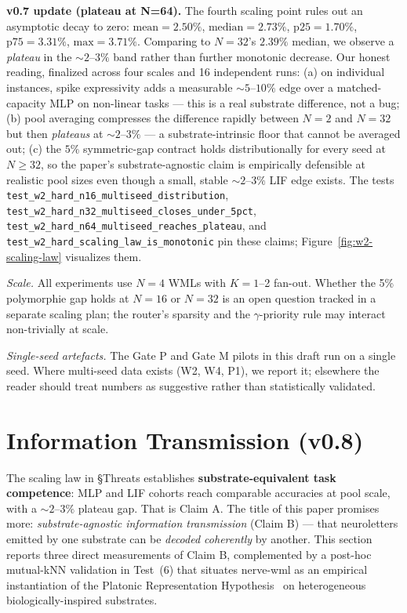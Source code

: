 \documentclass[10pt,twocolumn]{article}
\begin{document}
\textbf{v0.7 update (plateau at N=64).} The fourth scaling point rules out an asymptotic decay to zero: $\text{mean} = 2.50\%$, $\text{median} = 2.73\%$, $\text{p25} = 1.70\%$, $\text{p75} = 3.31\%$, $\text{max} = 3.71\%$. Comparing to $N=32$'s $2.39\%$ median, we observe a \emph{plateau} in the $\sim 2\text{--}3\%$ band rather than further monotonic decrease. Our honest reading, finalized across four scales and 16 independent runs: (a) on individual instances, spike expressivity adds a measurable $\sim 5\text{--}10\%$ edge over a matched-capacity MLP on non-linear tasks --- this is a real substrate difference, not a bug; (b) pool averaging compresses the difference rapidly between $N=2$ and $N=32$ but then \emph{plateaus} at $\sim 2\text{--}3\%$ --- a substrate-intrinsic floor that cannot be averaged out; (c) the $5\%$ symmetric-gap contract holds distributionally for every seed at $N \geq 32$, so the paper's substrate-agnostic claim is empirically defensible at realistic pool sizes even though a small, stable $\sim 2\text{--}3\%$ LIF edge exists. The tests \texttt{test\_w2\_hard\_n16\_multiseed\_distribution}, \texttt{test\_w2\_hard\_n32\_multiseed\_closes\_under\_5pct}, \texttt{test\_w2\_hard\_n64\_multiseed\_reaches\_plateau}, and \texttt{test\_w2\_hard\_scaling\_law\_is\_monotonic} pin these claims; Figure~\ref{fig:w2-scaling-law} visualizes them.

\textit{Scale.} All experiments use $N=4$ WMLs with $K=1$--2 fan-out. Whether the 5\% polymorphie gap holds at $N=16$ or $N=32$ is an open question tracked in a separate scaling plan; the router's sparsity and the $\gamma$-priority rule may interact non-trivially at scale.

\textit{Single-seed artefacts.} The Gate P and Gate M pilots in this draft run on a single seed. Where multi-seed data exists (W2, W4, P1), we report it; elsewhere the reader should treat numbers as suggestive rather than statistically validated.

\section{Information Transmission (v0.8)}
\label{sec:info-tx}

The scaling law in \S Threats establishes \textbf{substrate-equivalent task competence}: MLP and LIF cohorts reach comparable accuracies at pool scale, with a $\sim 2\text{--}3\%$ plateau gap. That is Claim A. The title of this paper promises more: \emph{substrate-agnostic information transmission} (Claim B) --- that neuroletters emitted by one substrate can be \emph{decoded coherently} by another. This section reports three direct measurements of Claim B, complemented by a post-hoc mutual-kNN validation in Test~(6) that situates nerve-wml as an empirical instantiation of the Platonic Representation Hypothesis~\cite{huh2024platonic} on heterogeneous biologically-inspired substrates.
\end{document}
